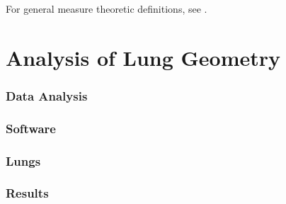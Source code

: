 \documentclass[]{article}
\theoremstyle{definition}
\theoremstyle{definition}
\begin{document}
For general measure theoretic definitions, see \cite{folland1999real}. 


\part{Analysis of Lung Geometry}

\section{Data Analysis}

\section{Software}

\section{Lungs}

\section{Results}









\pagebreak



\end{document}

